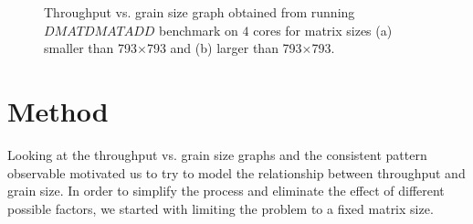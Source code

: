 
\begin{figure}

	\caption{Throughput vs. grain size graph obtained from running $DMATDMATADD$ benchmark  on $4$ cores for matrix sizes (a) smaller than 793$\times$793 and (b) larger than 793$\times$793.}
	\label{fig8}	
\end{figure}



\vspace{\baselineskip}	
\section{Method}
Looking at the throughput vs. grain size graphs and the consistent pattern observable motivated us to try to model the relationship between throughput and grain size. 
In order to simplify the process and eliminate the effect of different possible factors, we started with limiting the problem to a fixed matrix size. 

